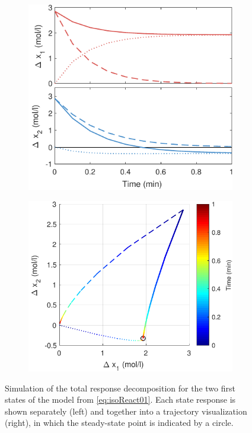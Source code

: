 \documentclass[a4paper,11pt]{book}
\numberwithin{figure}{chapter}
\numberwithin{equation}{chapter}
\numberwithin{table}{chapter}
\theoremstyle{definition}
\begin{document}
\begin{figure}[ht] \centering
    \begin{subfigure}{0.46\textwidth}
    	\includegraphics[width=\textwidth]{chapter2/linResp_2_1}
   	\end{subfigure} \hfill
    \begin{subfigure}{0.50	\textwidth}
    	\includegraphics[width=\textwidth]{chapter2/linResp_2_2}
   	\end{subfigure}

    \caption{Simulation of the total response decomposition for the two first states of the model from \eqref{eq:isoReact01}. Each state response is shown separately (left) and together into a trajectory visualization (right), in which the steady-state point is indicated by a circle.}
    \label{fig:linResp02}
\end{figure}
\end{document}
